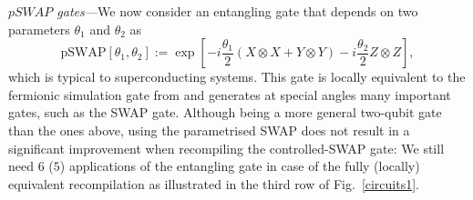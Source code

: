 \documentclass[aps,prx,showpacs,twocolumn,reprint]{revtex4-2}
\begin{document}
{\emph{$pSWAP$ gates---}We now consider an entangling gate that depends on two parameters $\theta_1$ and $\theta_2$
as
\begin{equation*}
	\text{pSWAP}[\theta_1,\theta_2] := \exp[-i \frac{\theta_1}{2}( X \otimes X + Y \otimes Y)  -i \frac{\theta_2}{2} Z \otimes Z],
\end{equation*}
which is typical to superconducting systems.
This gate is locally equivalent to the fermionic simulation gate from \cite{PhysRevLett.125.120504}
and generates at special angles many important gates, such as the SWAP gate. Although being a more general two-qubit
gate than the ones above, using the parametrised SWAP does not result in a significant improvement when recompiling
the controlled-SWAP gate: We still need
$6$ ($5$) applications of the entangling gate in case of the fully (locally) equivalent recompilation
as illustrated in the third row of Fig.~\ref{circuits1}.



}
\end{document}
